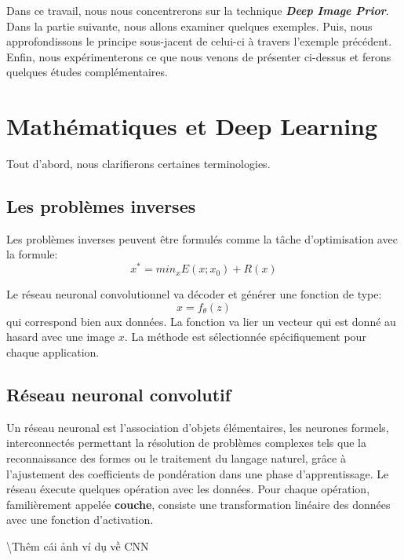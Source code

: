 \documentclass[
  11pt,
  dvipsnames]{article}
\begin{document}
Dans ce travail, nous nous concentrerons sur la technique \textbf{\emph{Deep Image Prior}}.
Dans la partie suivante, nous allons examiner quelques exemples.
Puis, nous approfondissons le principe sous-jacent de celui-ci à travers l'exemple précédent.
Enfin, nous expérimenterons ce que nous venons de présenter ci-dessus
et ferons quelques études complémentaires.

\newpage

\hypertarget{mathuxe9matiques-et-deep-learning}{%
\section{Mathématiques et Deep Learning}\label{mathuxe9matiques-et-deep-learning}}

Tout d'abord, nous clarifierons certaines terminologies.

\hypertarget{les-probluxe8mes-inverses}{%
\subsection{Les problèmes inverses}\label{les-probluxe8mes-inverses}}

Les problèmes inverses peuvent être formulés comme la tâche d'optimisation avec la formule:
\[x^* = min_{x}E(x;x_{0}) + R(x)\]

Le réseau neuronal convolutionnel va décoder et générer une fonction de type:
\[x = f_{\theta}(z)\]
qui correspond bien aux données. La fonction va lier un vecteur qui est donné au hasard avec une image \(x\).
La méthode est sélectionnée spécifiquement pour chaque application.

\hypertarget{ruxe9seau-neuronal-convolutif}{%
\subsection{Réseau neuronal convolutif}\label{ruxe9seau-neuronal-convolutif}}

Un réseau neuronal est l'association d'objets élémentaires, les neurones formels, interconnectés permettant la résolution de problèmes complexes tels que la reconnaissance des formes ou le traitement du langage naturel,
grâce à l'ajustement des coefficients de pondération dans une phase d'apprentissage. Le réseau éxecute quelques opération avec les données. Pour chaque opération, familièrement appelée \textbf{couche}, consiste une transformation linéaire des données avec une fonction d'activation.

\textbackslash Thêm cái ảnh ví dụ về CNN
\end{document}
